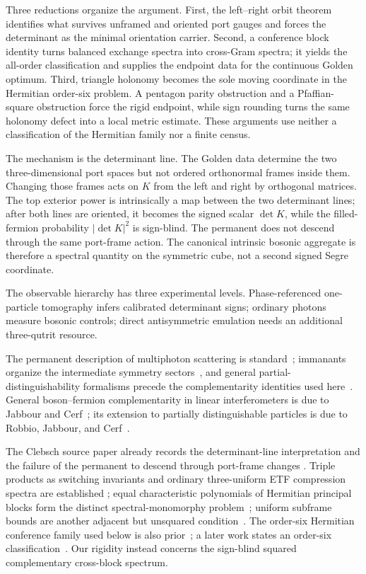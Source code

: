 \documentclass[11pt]{article}
\theoremstyle{remark}
\begin{document}
Three reductions organize the argument.  First, the left--right orbit theorem
identifies what survives unframed and oriented port gauges and forces the
determinant as the minimal orientation carrier.  Second, a conference block
identity turns balanced exchange spectra into cross-Gram spectra; it yields
the all-order classification and supplies the endpoint data for the
continuous Golden optimum.  Third, triangle holonomy becomes the sole moving
coordinate in the Hermitian
order-six problem.  A pentagon parity obstruction and a Pfaffian-square
obstruction force the rigid endpoint, while sign rounding turns the same
holonomy defect into a local metric estimate.  These arguments use neither a
classification of the Hermitian family nor a finite census.

The mechanism is the determinant line.  The Golden data determine the two
three-dimensional port spaces but not ordered orthonormal frames inside them.
Changing those frames acts on \(K\) from the left and right by orthogonal
matrices.  The top exterior power is intrinsically a map between the two
determinant lines; after both lines are oriented, it becomes the signed scalar
\(\det K\), while the filled-fermion probability \(|\det K|^2\) is
sign-blind.  The permanent does not descend through the same port-frame
action.  The canonical intrinsic bosonic aggregate is therefore a spectral
quantity on the symmetric cube, not a second signed Segre coordinate.

The observable hierarchy has three experimental levels.  Phase-referenced
one-particle tomography infers calibrated determinant signs; ordinary photons
measure bosonic controls; direct antisymmetric emulation needs an additional
three-qutrit resource.

The permanent description of multiphoton scattering is
standard~\cite{Scheel}; immanants
organize the intermediate symmetry sectors~\cite{Tichy}, and general
partial-distinguishability formalisms precede the complementarity identities
used here~\cite{Shchesnovich}.  General boson--fermion complementarity in
linear interferometers is due to
Jabbour and Cerf~\cite{JabbourCerf}; its extension to partially distinguishable
particles is due to Robbio, Jabbour, and Cerf~\cite{RobbioJabbourCerf}.

The
Clebsch source paper already records the determinant-line interpretation and
the failure of the permanent to descend through port-frame changes
\cite[Section~5]{ClebschIII}.  Triple products as switching invariants and
ordinary three-uniform ETF compression spectra are established
\cite{BodmannPaulsen,HoffmanSolazzo,KingHomogeneous}; equal characteristic
polynomials of Hermitian principal blocks form the distinct spectral-monomorphy
problem~\cite{AttasSpectral}; uniform subframe bounds are another adjacent but
unsquared condition~\cite{ChengUSB}.  The order-six Hermitian conference family used
below is also prior~\cite{EtTaouiConference}; a later work states an
order-six classification~\cite{EtTaouiMakhlouf}.  Our rigidity instead
concerns the sign-blind squared complementary cross-block spectrum.
\end{document}
